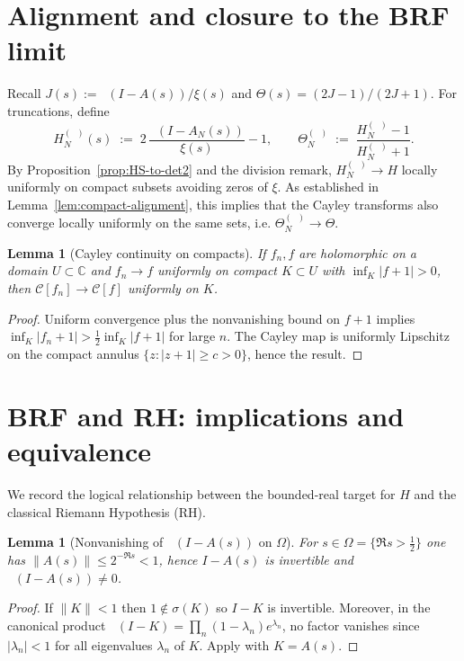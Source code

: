 \documentclass[11pt]{article}
\newtheorem{lemma}[theorem]{Lemma}
\theoremstyle{remark}
\newcommand{\C}{\mathbb{C}}
\DeclareMathOperator{\dettwo}{det_2}
\begin{document}
\section{Alignment and closure to the BRF limit}\label{sec:alignment}
Recall \(J(s):=\dettwo(I-A(s))/\xi(s)\) and \(\Theta(s)=(2J-1)/(2J+1)\). For truncations, define
\[
 H_N^{(\dettwo)}(s)\;:=\;2\,\frac{\dettwo(I-A_N(s))}{\xi(s)}-1,\qquad \Theta_N^{(\dettwo)}\;:=\;\frac{H_N^{(\dettwo)}-1}{H_N^{(\dettwo)}+1}.
\]
By Proposition~\ref{prop:HS-to-det2} and the division remark, \(H_N^{(\dettwo)}\to H\) locally uniformly on compact subsets avoiding zeros of \(\xi\). As established in Lemma~\ref{lem:compact-alignment}, this implies that the Cayley transforms also converge locally uniformly on the same sets, i.e. \(\Theta_N^{(\dettwo)}\to\Theta\).

\begin{lemma}[Cayley continuity on compacts]\label{lem:cayley-cont}
If \(f_n,f\) are holomorphic on a domain \(U\subset\C\) and \(f_n\to f\) uniformly on compact \(K\subset U\) with \(\inf_{K}|f+1|>0\), then \(\mathcal C[f_n]\to\mathcal C[f]\) uniformly on \(K\).
\end{lemma}
\begin{proof}
Uniform convergence plus the nonvanishing bound on \(f+1\) implies \(\inf_{K}|f_n+1|>\tfrac12\inf_{K}|f+1|\) for large \(n\). The Cayley map is uniformly Lipschitz on the compact annulus \(\{z: |z+1|\ge c>0\}\), hence the result.
\end{proof}

\section{BRF and RH: implications and equivalence}\label{sec:brf-rh}
We record the logical relationship between the bounded-real target for $H$ and the classical Riemann Hypothesis (RH).

\begin{lemma}[Nonvanishing of $\dettwo(I-A(s))$ on $\Omega$]\label{lem:nonvanish-det2}
For $s\in\Omega=\{\Re s>\tfrac12\}$ one has $\|A(s)\|\le 2^{-\Re s}<1$, hence $I-A(s)$ is invertible and $\dettwo(I-A(s))\ne 0$.
\end{lemma}
\begin{proof}
If $\|K\|<1$ then $1\notin\sigma(K)$ so $I-K$ is invertible. Moreover, in the canonical product $\dettwo(I-K)=\prod_n (1-\lambda_n) e^{\lambda_n}$, no factor vanishes since $|\lambda_n|<1$ for all eigenvalues $\lambda_n$ of $K$. Apply with $K=A(s)$.
\end{proof}
\end{document}
